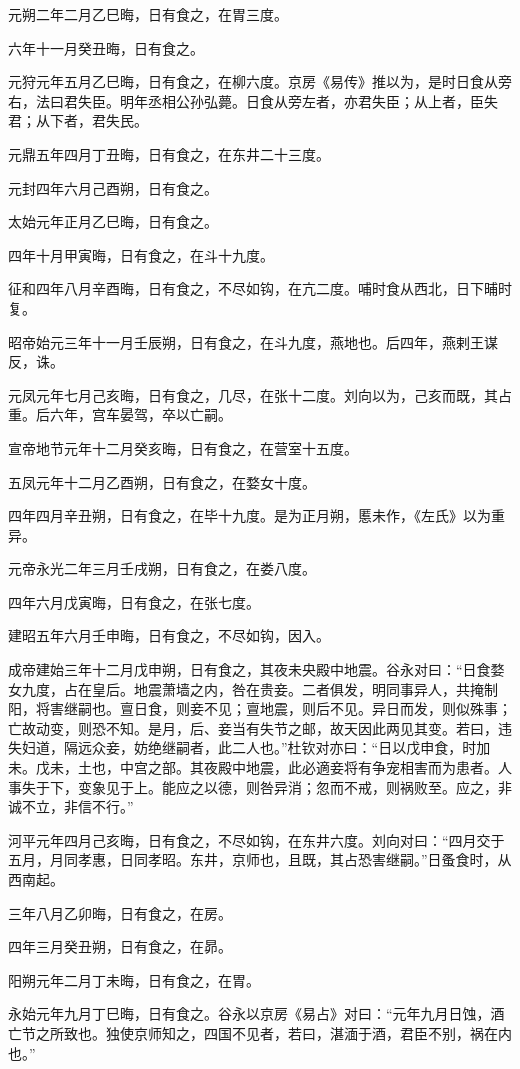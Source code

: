 \documentclass[]{article}
\begin{document}
元朔二年二月乙巳晦，日有食之，在胃三度。

六年十一月癸丑晦，日有食之。

元狩元年五月乙巳晦，日有食之，在柳六度。京房《易传》推以为，是时日食从旁右，法曰君失臣。明年丞相公孙弘薨。日食从旁左者，亦君失臣；从上者，臣失君；从下者，君失民。

元鼎五年四月丁丑晦，日有食之，在东井二十三度。

元封四年六月己酉朔，日有食之。

太始元年正月乙巳晦，日有食之。

四年十月甲寅晦，日有食之，在斗十九度。

征和四年八月辛酉晦，日有食之，不尽如钩，在亢二度。哺时食从西北，日下晡时复。

昭帝始元三年十一月壬辰朔，日有食之，在斗九度，燕地也。后四年，燕剌王谋反，诛。

元凤元年七月己亥晦，日有食之，几尽，在张十二度。刘向以为，己亥而既，其占重。后六年，宫车晏驾，卒以亡嗣。

宣帝地节元年十二月癸亥晦，日有食之，在营室十五度。

五凤元年十二月乙酉朔，日有食之，在婺女十度。

四年四月辛丑朔，日有食之，在毕十九度。是为正月朔，慝未作，《左氏》以为重异。

元帝永光二年三月壬戌朔，日有食之，在娄八度。

四年六月戊寅晦，日有食之，在张七度。

建昭五年六月壬申晦，日有食之，不尽如钩，因入。

成帝建始三年十二月戊申朔，日有食之，其夜未央殿中地震。谷永对曰：``日食婺女九度，占在皇后。地震萧墙之内，咎在贵妾。二者俱发，明同事异人，共掩制阳，将害继嗣也。亶日食，则妾不见；亶地震，则后不见。异日而发，则似殊事；亡故动变，则恐不知。是月，后、妾当有失节之邮，故天因此两见其变。若曰，违失妇道，隔远众妾，妨绝继嗣者，此二人也。''杜钦对亦曰：``日以戊申食，时加未。戊未，土也，中宫之部。其夜殿中地震，此必適妾将有争宠相害而为患者。人事失于下，变象见于上。能应之以德，则咎异消；忽而不戒，则祸败至。应之，非诚不立，非信不行。''

河平元年四月己亥晦，日有食之，不尽如钩，在东井六度。刘向对曰：``四月交于五月，月同孝惠，日同孝昭。东井，京师也，且既，其占恐害继嗣。''日蚤食时，从西南起。

三年八月乙卯晦，日有食之，在房。

四年三月癸丑朔，日有食之，在昴。

阳朔元年二月丁未晦，日有食之，在胃。

永始元年九月丁巳晦，日有食之。谷永以京房《易占》对曰：``元年九月日蚀，酒亡节之所致也。独使京师知之，四国不见者，若曰，湛湎于酒，君臣不别，祸在内也。''
\end{document}
